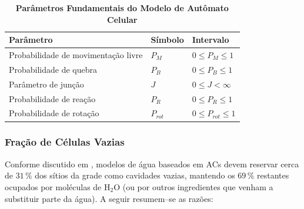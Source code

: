 \documentclass[12pt,oneside]{report}
\begin{document}
\begin{table}[H]
    \centering
    \caption{\textbf{Parâmetros Fundamentais do Modelo de Autômato Celular}}
    \vspace{0.2cm}
    \begin{tabularx}{\textwidth}{X m{3cm} m{3cm}}
        \hline
        \textbf{Parâmetro}                  & \textbf{Símbolo} & \textbf{Intervalo}      \\
        \hline
        Probabilidade de movimentação livre & $P_M$            & $0 \leq P_M \leq 1$     \\
        Probabilidade de quebra             & $P_B$            & $0 \leq P_B \leq 1$     \\
        Parâmetro de junção                 & $J$              & $0 \leq J < \infty$     \\
        Probabilidade de reação             & $P_R$            & $0 \leq P_R \leq 1$     \\
        Probabilidade de rotação            & $P_{rot}$        & $0 \leq P_{rot} \leq 1$ \\
        \hline
    \end{tabularx}

    \vspace{0.2cm}
\end{table}

\subsubsection{Fração de Células Vazias}
\label{subsubsec:fracao_celulas_vazias}

Conforme discutido em \citeauthor*{kier2005}, modelos de água baseados em ACs devem reservar cerca de $31\,\%$ dos sítios da grade como
cavidades vazias, mantendo os $69\,\%$ restantes ocupados por moléculas de
H$_2$O (ou por outros ingredientes que venham a substituir parte da água).
A seguir resumem--se as razões:
\end{document}
